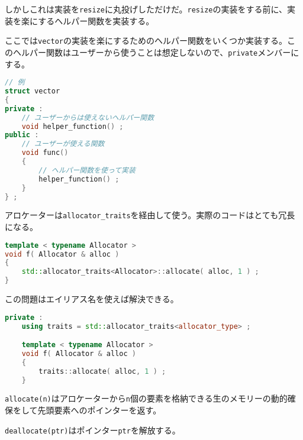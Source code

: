 しかしこれは実装を\texttt{resize}に丸投げしただけだ。\texttt{resize}の実装をする前に、実装を楽にするヘルパー関数を実装する。


ここでは\texttt{vector}の実装を楽にするためのヘルパー関数をいくつか実装する。このヘルパー関数はユーザーから使うことは想定しないので、\texttt{private}メンバーにする。

\begin{lstlisting}[language={C++}]
// 例
struct vector
{
private :
    // ユーザーからは使えないヘルパー関数
    void helper_function() ;
public :
    // ユーザーが使える関数
    void func()
    {
        // ヘルパー関数を使って実装
        helper_function() ;
    }
} ;
\end{lstlisting}


アロケーターは\texttt{allocator\_traits}を経由して使う。実際のコードはとても冗長になる。

\begin{lstlisting}[language={C++}]
template < typename Allocator >
void f( Allocator & alloc )
{
    std::allocator_traits<Allocator>::allocate( alloc, 1 ) ;
}
\end{lstlisting}

この問題はエイリアス名を使えば解決できる。

\begin{lstlisting}[language={C++}]
private :
    using traits = std::allocator_traits<allocator_type> ;

    template < typename Allocator >
    void f( Allocator & alloc )
    {
        traits::allocate( alloc, 1 ) ;
    }
\end{lstlisting}


\texttt{allocate(n)}はアロケーターから\texttt{n}個の要素を格納できる生のメモリーの動的確保をして先頭要素へのポインターを返す。

\texttt{deallocate(ptr)}はポインター\texttt{ptr}を解放する。

